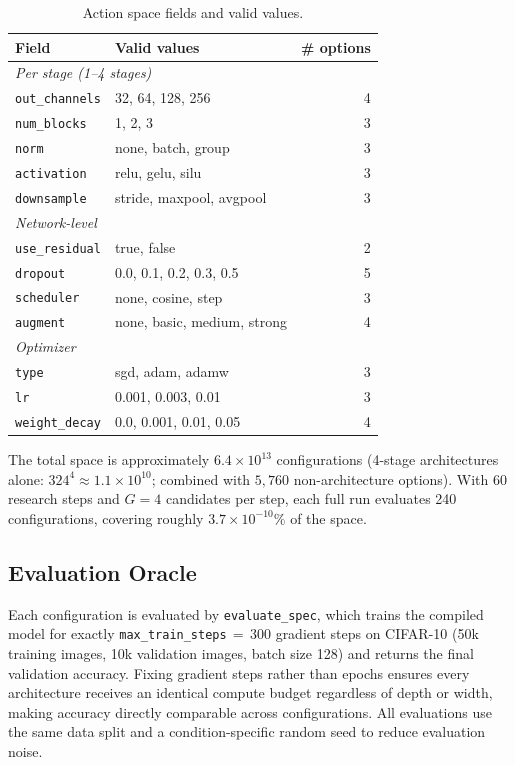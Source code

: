 \begin{table}[h]
\centering
\caption{Action space fields and valid values.}
\label{tab:action_space}
\small
\begin{tabular}{llr}
\toprule
\textbf{Field} & \textbf{Valid values} & \textbf{\# options} \\
\midrule
\multicolumn{3}{l}{\textit{Per stage (1--4 stages)}} \\
\quad \texttt{out\_channels} & 32, 64, 128, 256 & 4 \\
\quad \texttt{num\_blocks}   & 1, 2, 3           & 3 \\
\quad \texttt{norm}          & none, batch, group & 3 \\
\quad \texttt{activation}    & relu, gelu, silu   & 3 \\
\quad \texttt{downsample}    & stride, maxpool, avgpool & 3 \\
\midrule
\multicolumn{3}{l}{\textit{Network-level}} \\
\quad \texttt{use\_residual} & true, false       & 2 \\
\quad \texttt{dropout}       & 0.0, 0.1, 0.2, 0.3, 0.5 & 5 \\
\quad \texttt{scheduler}     & none, cosine, step & 3 \\
\quad \texttt{augment}       & none, basic, medium, strong & 4 \\
\midrule
\multicolumn{3}{l}{\textit{Optimizer}} \\
\quad \texttt{type}          & sgd, adam, adamw  & 3 \\
\quad \texttt{lr}            & 0.001, 0.003, 0.01 & 3 \\
\quad \texttt{weight\_decay} & 0.0, 0.001, 0.01, 0.05 & 4 \\
\bottomrule
\end{tabular}
\end{table}

The total space is approximately $6.4 \times 10^{13}$ configurations
(4-stage architectures alone: $324^4 \approx 1.1 \times 10^{10}$; combined
with $5{,}760$ non-architecture options).
With 60 research steps and $G{=}4$ candidates per step, each full run evaluates
240 configurations, covering roughly $3.7 \times 10^{-10}\%$ of the space.

\subsection{Evaluation Oracle}
\label{sec:oracle}

Each configuration is evaluated by \texttt{evaluate\_spec}, which trains the
compiled model for exactly \texttt{max\_train\_steps}$\,{=}\,300$ gradient
steps on CIFAR-10 (50k training images, 10k validation images,
batch size 128) and returns the final validation accuracy.
Fixing gradient steps rather than epochs ensures every architecture receives
an identical compute budget regardless of depth or width, making accuracy
directly comparable across configurations.
All evaluations use the same data split and a condition-specific random seed
to reduce evaluation noise.


